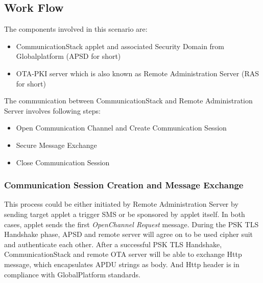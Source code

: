 \subsection {Work Flow}

The components involved in this scenario are:
 \begin{itemize}
  \item CommunicationStack applet and associated Security Domain from Globalplatform (APSD  for short)
  \item OTA-PKI server which is also known as Remote Administration Server (RAS for short)
\end{itemize}

The communication between CommunicationStack and Remote Administration Server involves following  steps:

 \begin{itemize}
  \item Open Communication Channel and Create Communication Session
  \item Secure Message Exchange
  \item Close Communication Session
\end{itemize}
\subsubsection{Communication Session Creation and Message Exchange}
This process could be either initiated by Remote Administration Server by sending target applet a trigger SMS or be sponsored by applet itself. In both cases, applet sends the first \emph{OpenChannel Request} message. During the PSK TLS Handshake phase, APSD and remote server will agree on to be used cipher suit and authenticate each other. After a successful PSK TLS Handshake, CommunicationStack and remote OTA server will be able to exchange Http message, which encapsulates APDU strings as body. And Http header is in compliance with GlobalPlatform standards.


